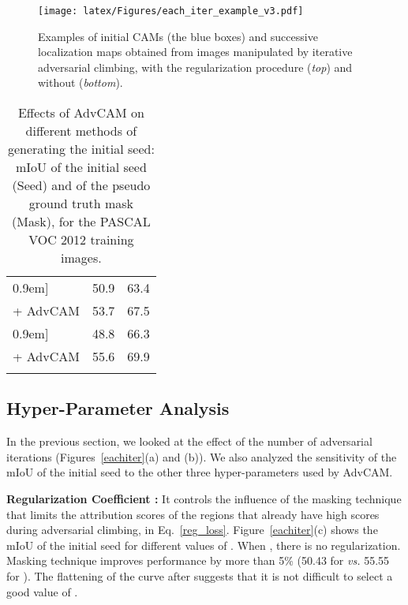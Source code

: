 \documentclass[final]{cvpr}
\begin{document}
\begin{figure*}[t]
\centering
\vspace{-0.2em}
\texttt{[image: latex/Figures/each\_iter\_example\_v3.pdf]}
\vspace{-2em}
\caption{\label{eachiter_ex} Examples of initial CAMs (the blue boxes) and successive localization maps obtained from images manipulated by iterative adversarial climbing, with the regularization procedure (\textit{top}) and without (\textit{bottom}).}
\vspace{-1.em}
\end{figure*}
 













\begin{table}[tbp]
\renewcommand{\arraystretch}{0.92}
  \centering
  \caption{Effects of AdvCAM on different methods of generating the initial seed: mIoU of the initial seed (Seed) and of the pseudo ground truth mask (Mask), for the PASCAL VOC 2012 training images.}
  \vspace{-0.7em}
    \begin{tabular}{l@{\hskip 0.25in}l@{\hskip 0.25in}l}
     \Xhline{1pt}\-0.9em]
    ~\cite{chang2020weakly} & 50.9 & 63.4 \\
    + AdvCAM  &53.7 & 67.5  \\
    \hline \-0.9em]
    ~\cite{ahn2018learning} & 48.8  & 66.3  \\
    + AdvCAM  & 55.6  & 69.9   \\
\Xhline{1pt}
    \vspace{-1.5em}
    \end{tabular}\label{tab:baselines}\end{table}


%
 
\subsection{Hyper-Parameter Analysis}\label{hyperparam}
In the previous section, we looked at the effect of the number of adversarial iterations (Figures~\ref{eachiter}(a) and (b)).
We also analyzed the sensitivity of the mIoU of the initial seed to the other three hyper-parameters used by AdvCAM. 


\textbf{Regularization Coefficient :} It controls the influence of the masking technique that limits the attribution scores of the regions that already have high scores during adversarial climbing, in Eq.~\ref{reg_loss}.
Figure~\ref{eachiter}(c) shows the mIoU of the initial seed for different values of . When , there is no regularization.
Masking technique improves performance by more than 5\% (50.43 for  \textit{vs.} 55.55 for ).
The flattening of the curve after  suggests that it is not difficult to select a good value of .
\end{document}
